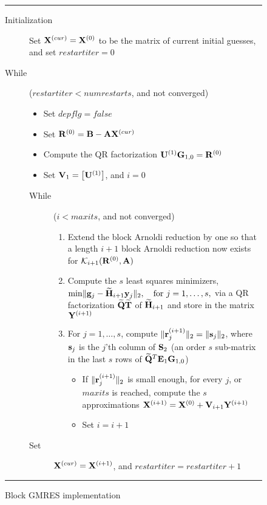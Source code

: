 \documentclass[twoside]{siamltex}
\newcommand{\bA}{{\bf A}}
\newcommand{\bB}{{\bf B}}
\newcommand{\bE}{{\bf E}}
\newcommand{\bG}{{\bf G}}
\newcommand{\bH}{{\bf H}}
\newcommand{\bV}{{\bf V}}
\newcommand{\bU}{{\bf U}}
\newcommand{\bQ}{{\bf Q}}
\newcommand{\bR}{{\bf R}}
\newcommand{\bS}{{\bf S}}
\newcommand{\bT}{{\bf T}}
\newcommand{\bX}{{\bf X}}
\newcommand{\bY}{{\bf Y}}
\newcommand{\by}{{\bf y}}
\newcommand{\br}{{\bf r}}
\newcommand{\bs}{{\bf s}}
\begin{document}
{\small
\begin{figure}[hbt]
\vspace{.05in} \hrule \vspace{.1in}
\begin{description}
\item[Initialization]
Set $ \bX^{(cur)} = \bX^{(0)}$ to be the  matrix of current
initial guesses, and set $restartiter=0$
\item[While] ($restartiter < numrestarts$, and not converged)
\begin{itemize}
\item Set $depflg = false$
\item Set $\bR^{(0)} = \bB - \bA \bX^{(cur)}$
\item Compute the QR factorization $\bU^{(1)} \bG_{1,0} =
\bR^{(0)}$
\item Set $\bV_1 = \left[ \bU^{(1)} \right]$, and $i=0$
\end{itemize}
\begin{description}
\item [While] ($i < maxits$, and not converged)
\begin{enumerate}
\item  Extend the block Arnoldi reduction by one so that a
length $i+1$ block Arnoldi reduction now exists for ${\cal
K}_{i+1}(\bR^{(0)}, \bA)$

\item Compute the $s$ least squares minimizers,\\
${\rm min}\| {\bf g}_j - \widetilde{\bH}_{i+1} \by_j \|_2, \quad
{\rm for}~ j = 1, \ldots, s, $  via a QR factorization
$\widetilde{\bQ} \widetilde{\bT}$ of $\widetilde{\bH}_{i+1}$ and
store in the matrix $\bY^{(i+1)}$

\item For $j = 1,\ldots, s$, compute $\| \br_j^{(i+1)} \|_2 = \| \bs_j \|_2$, where
$\bs_j$ is the $j$'th column of $\bS_2$ (an order $s$ sub-matrix
in the last $s$ rows of $\widetilde{\bQ}^T \bE_1 \bG_{1,0}$)

\begin{itemize}
\item If $\| \br_j^{(i+1)} \|_2 $ is small enough, for every $j$, or $maxits$ is reached,
compute the $s$ approximations $\bX^{(i+1)} = \bX^{(0)} +
\bV_{i+1} \bY^{(i+1)}$
\item Set $i = i+1$
\end{itemize}

\end{enumerate}

\item [Set] $\bX^{(cur)} = \bX^{(i+1)}$, and $restartiter =
restartiter + 1$
\end{description}

\end{description}
\vspace{.1in} \hrule \caption{Block GMRES implementation}
\label{fig:bGMRES}
\end{figure}
}
\end{document}
